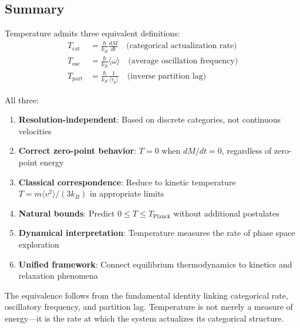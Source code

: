 \subsection{Summary}

Temperature admits three equivalent definitions:
\begin{align}
T_{\text{cat}} &= \frac{\hbar}{k_B}\frac{dM}{dt} \quad \text{(categorical actualization rate)} \\
T_{\text{osc}} &= \frac{\hbar}{k_B}\langle\omega\rangle \quad \text{(average oscillation frequency)} \\
T_{\text{part}} &= \frac{\hbar}{k_B}\frac{1}{\langle\tau_p\rangle} \quad \text{(inverse partition lag)}
\end{align}

All three:
\begin{enumerate}
\item \textbf{Resolution-independent}: Based on discrete categories, not continuous velocities
\item \textbf{Correct zero-point behavior}: $T = 0$ when $dM/dt = 0$, regardless of zero-point energy
\item \textbf{Classical correspondence}: Reduce to kinetic temperature $T = m\langle v^2\rangle/(3k_B)$ in appropriate limits
\item \textbf{Natural bounds}: Predict $0 \leq T \leq T_{\text{Planck}}$ without additional postulates
\item \textbf{Dynamical interpretation}: Temperature measures the rate of phase space exploration
\item \textbf{Unified framework}: Connect equilibrium thermodynamics to kinetics and relaxation phenomena
\end{enumerate}

The equivalence follows from the fundamental identity linking categorical rate, oscillatory frequency, and partition lag. Temperature is not merely a measure of energy---it is the rate at which the system actualizes its categorical structure.
